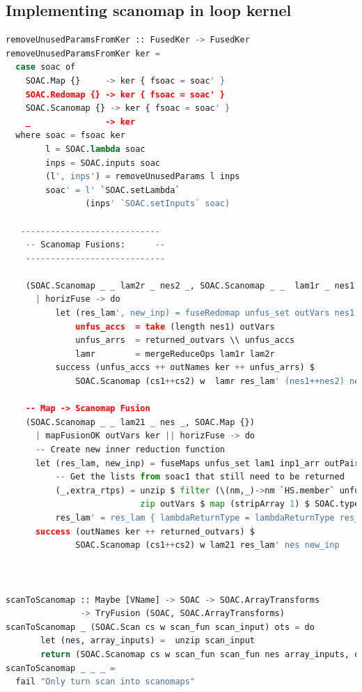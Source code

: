 \documentclass[11pt]{article}
\begin{document}
\subsection{Implementing scanomap in loop kernel}
\begin{lstlisting}[language=Python,caption=Scanomap implementation in loop kernel] 
removeUnusedParamsFromKer :: FusedKer -> FusedKer
removeUnusedParamsFromKer ker =
  case soac of
    SOAC.Map {}     -> ker { fsoac = soac' }
    SOAC.Redomap {} -> ker { fsoac = soac' }
    SOAC.Scanomap {} -> ker { fsoac = soac' }
    _               -> ker
  where soac = fsoac ker
        l = SOAC.lambda soac
        inps = SOAC.inputs soac
        (l', inps') = removeUnusedParams l inps
        soac' = l' `SOAC.setLambda`
                (inps' `SOAC.setInputs` soac)
                
   ----------------------------
    -- Scanomap Fusions:      --
    ----------------------------

    (SOAC.Scanomap _ _ lam2r _ nes2 _, SOAC.Scanomap _ _  lam1r _ nes1 _)
      | horizFuse -> do
          let (res_lam', new_inp) = fuseRedomap unfus_set outVars nes1 lam1 inp1_arr outPairs lam2 inp2_arr
              unfus_accs  = take (length nes1) outVars
              unfus_arrs  = returned_outvars \\ unfus_accs
              lamr        = mergeReduceOps lam1r lam2r
          success (unfus_accs ++ outNames ker ++ unfus_arrs) $
              SOAC.Scanomap (cs1++cs2) w  lamr res_lam' (nes1++nes2) new_inp

    -- Map -> Scanomap Fusion
    (SOAC.Scanomap _ _ lam21 _ nes _, SOAC.Map {})
      | mapFusionOK outVars ker || horizFuse -> do
      -- Create new inner reduction function
      let (res_lam, new_inp) = fuseMaps unfus_set lam1 inp1_arr outPairs lam2 inp2_arr
          -- Get the lists from soac1 that still need to be returned
          (_,extra_rtps) = unzip $ filter (\(nm,_)->nm `HS.member` unfus_set) $
                           zip outVars $ map (stripArray 1) $ SOAC.typeOf soac1
          res_lam' = res_lam { lambdaReturnType = lambdaReturnType res_lam ++ extra_rtps }
      success (outNames ker ++ returned_outvars) $
              SOAC.Scanomap (cs1++cs2) w lam21 res_lam' nes new_inp
  
  
              
scanToScanomap :: Maybe [VName] -> SOAC -> SOAC.ArrayTransforms
               -> TryFusion (SOAC, SOAC.ArrayTransforms)
scanToScanomap _ (SOAC.Scan cs w scan_fun scan_input) ots = do
       let (nes, array_inputs) =  unzip scan_input
       return (SOAC.Scanomap cs w scan_fun scan_fun nes array_inputs, ots)
scanToScanomap _ _ _ =
  fail "Only turn scan into scanomaps"
\end{lstlisting}
\end{document}
